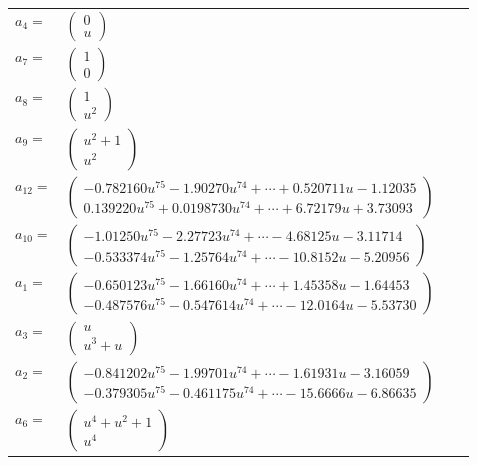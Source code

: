 \documentclass[1p]{elsarticle_modified}
\theoremstyle{definition}
\begin{document}
\begin{tabular}{m{7pt} m{180pt} m{7pt} m{180pt} }
\flushright $a_{4}=$&$\begin{pmatrix}0\\u\end{pmatrix}$ \\
\flushright $a_{7}=$&$\begin{pmatrix}1\\0\end{pmatrix}$ \\
\flushright $a_{8}=$&$\begin{pmatrix}1\\u^2\end{pmatrix}$ \\
\flushright $a_{9}=$&$\begin{pmatrix}u^2+1\\u^2\end{pmatrix}$ \\
\flushright $a_{12}=$&$\begin{pmatrix}-0.782160 u^{75}-1.90270 u^{74}+\cdots+0.520711 u-1.12035\\0.139220 u^{75}+0.0198730 u^{74}+\cdots+6.72179 u+3.73093\end{pmatrix}$ \\
\flushright $a_{10}=$&$\begin{pmatrix}-1.01250 u^{75}-2.27723 u^{74}+\cdots-4.68125 u-3.11714\\-0.533374 u^{75}-1.25764 u^{74}+\cdots-10.8152 u-5.20956\end{pmatrix}$ \\
\flushright $a_{1}=$&$\begin{pmatrix}-0.650123 u^{75}-1.66160 u^{74}+\cdots+1.45358 u-1.64453\\-0.487576 u^{75}-0.547614 u^{74}+\cdots-12.0164 u-5.53730\end{pmatrix}$ \\
\flushright $a_{3}=$&$\begin{pmatrix}u\\u^3+u\end{pmatrix}$ \\
\flushright $a_{2}=$&$\begin{pmatrix}-0.841202 u^{75}-1.99701 u^{74}+\cdots-1.61931 u-3.16059\\-0.379305 u^{75}-0.461175 u^{74}+\cdots-15.6666 u-6.86635\end{pmatrix}$ \\
\flushright $a_{6}=$&$\begin{pmatrix}u^4+u^2+1\\u^4\end{pmatrix}$ \\

\end{tabular}
\end{document}
